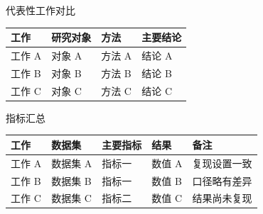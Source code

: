 \begin{frame}{代表性工作对比}
  \small
  \begin{tabularx}{\linewidth}{@{}YYYY@{}}
    \toprule
    \textbf{工作} & \textbf{研究对象} & \textbf{方法} & \textbf{主要结论} \\
    \midrule
    工作 A & 对象 A & 方法 A & 结论 A \\
    工作 B & 对象 B & 方法 B & 结论 B \\
    工作 C & 对象 C & 方法 C & 结论 C \\
    \bottomrule
  \end{tabularx}
\end{frame}

\begin{frame}{指标汇总}
  \small
  \begin{tabularx}{\linewidth}{@{}lYYYY@{}}
    \toprule
    \textbf{工作} & \textbf{数据集} & \textbf{主要指标} & \textbf{结果} & \textbf{备注} \\
    \midrule
    工作 A & 数据集 A & 指标一 & 数值 A & 复现设置一致 \\
    工作 B & 数据集 B & 指标一 & 数值 B & 口径略有差异 \\
    工作 C & 数据集 C & 指标二 & 数值 C & 结果尚未复现 \\
    \bottomrule
  \end{tabularx}
\end{frame}
